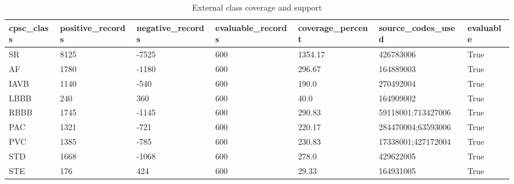 \begin{table}[htbp]\centering\small
\caption{External class coverage and support}\label{tab:extcoverage}
\begin{tabular}{lllllll}
\hline
cpsc_class & positive_records & negative_records & evaluable_records & coverage_percent & source_codes_used & evaluable \\
\hline
SR & 8125 & -7525 & 600 & 1354.17 & 426783006 & True \\
AF & 1780 & -1180 & 600 & 296.67 & 164889003 & True \\
IAVB & 1140 & -540 & 600 & 190.0 & 270492004 & True \\
LBBB & 240 & 360 & 600 & 40.0 & 164909002 & True \\
RBBB & 1745 & -1145 & 600 & 290.83 & 59118001;713427006 & True \\
PAC & 1321 & -721 & 600 & 220.17 & 284470004;63593006 & True \\
PVC & 1385 & -785 & 600 & 230.83 & 17338001;427172004 & True \\
STD & 1668 & -1068 & 600 & 278.0 & 429622005 & True \\
STE & 176 & 424 & 600 & 29.33 & 164931005 & True \\
\hline
\end{tabular}
\end{table}

